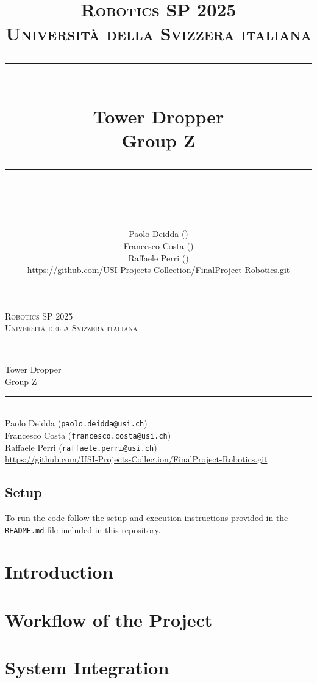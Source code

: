 \documentclass[twocolumn]{article}
\title{
	\normalfont\normalsize
	\textsc{Robotics SP 2025\\
	Universit\`a della Svizzera italiana}\\
	\rule{\linewidth}{0.5pt}\\
	{\huge Tower Dropper\\
	\small Group Z}\\
	\rule{\linewidth}{1pt}\\
	\vspace{5pt}
}
\author{
	Paolo Deidda (\text{paolo.deidda@usi.ch}) \\ 
	Francesco Costa (\text{francesco.costa@usi.ch})\\
	Raffaele Perri (\text{raffaele.perri@usi.ch})\\
	\url{https://github.com/USI-Projects-Collection/FinalProject-Robotics.git}
	}
\begin{document}
\begin{titlepage}
    \begin{center}
        \textsc{Robotics SP 2025\\
        Universit\`a della Svizzera italiana}\\[1ex]
        
        \rule{\linewidth}{0.5pt}\\[1ex]
        {\huge Tower Dropper\\[0.5ex]
        \small Group Z}\\[1ex]
        \rule{\linewidth}{1pt}\\[2ex]

        \normalsize
        Paolo Deidda (\texttt{paolo.deidda@usi.ch})\\
        Francesco Costa (\texttt{francesco.costa@usi.ch})\\
        Raffaele Perri (\texttt{raffaele.perri@usi.ch})\\[1ex]
        \url{https://github.com/USI-Projects-Collection/FinalProject-Robotics.git}
    \end{center}

    \vspace{2em}
    \tableofcontents

    \vfill
    \subsection*{Setup}
    To run the code follow the setup and execution instructions provided in the \texttt{README.md} file included in this repository.
\end{titlepage}

\section{Introduction}\label{sec:intro}


\section{Workflow of the Project}\label{sec:workflow}


\section{System Integration}\label{sec:integration}

\end{document}
